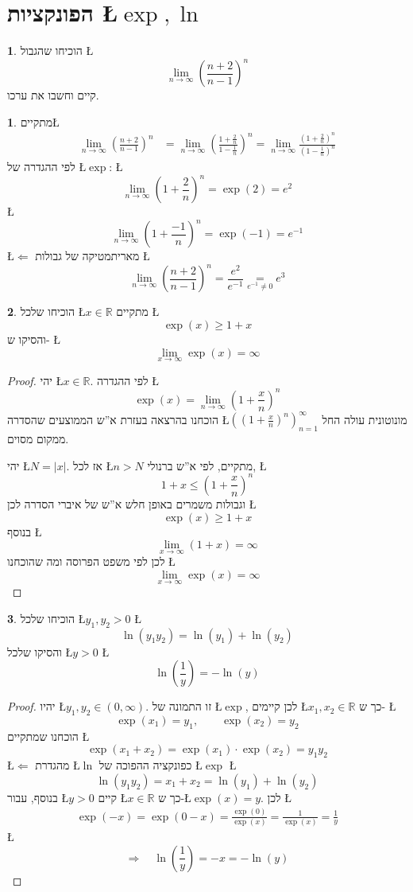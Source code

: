 \documentclass[english,hebrew]{article}
\theoremstyle{definition}
\newtheorem*{problem*}{\protect\problemname}
\theoremstyle{definition}
\newtheorem*{sol*}{\protect\solutionname}
\providecommand{\problemname}{בעיה}
\providecommand{\solutionname}{פתרון}
\begin{document}
\part{הפונקציות \L{$\exp,\ln$}}
\begin{problem*}
הוכיחו שהגבול \L{%
\[
\lim_{n\to\infty}\left(\frac{n+2}{n-1}\right)^{n}
\]
}%
קיים וחשבו את ערכו.
\end{problem*}
\begin{sol*}
מתקיים\L{%
\begin{align*}
\lim_{n\to\infty}\left(\frac{n+2}{n-1}\right)^{n} & =\lim_{n\to\infty}\left(\frac{1+\frac{2}{n}}{1-\frac{1}{n}}\right)^{n}=\lim_{n\to\infty}\frac{\left(1+\frac{2}{n}\right)^{n}}{\left(1-\frac{1}{n}\right)^{n}}
\end{align*}
}%
לפי ההגדרה של \L{$\exp$}: \L{%
\[
\lim_{n\to\infty}\left(1+\frac{2}{n}\right)^{n}=\exp(2)=e^{2}
\]
}%
\L{%
\[
\lim_{n\to\infty}\left(1+\frac{-1}{n}\right)^{n}=\exp(-1)=e^{-1}
\]
}%
\L{$\Leftarrow$} מאריתמטיקה של גבולות \L{%
\[
\lim_{n\to\infty}\left(\frac{n+2}{n-1}\right)^{n}=\frac{e^{2}}{e^{-1}}\underset{e^{-1}\ne0}{=}e^{3}
\]
}%
\end{sol*}
\begin{problem*}
הוכיחו שלכל \L{$x\in\mathbb{R}$} מתקיים \L{%
\[
\exp(x)\ge1+x
\]
}%
והסיקו ש- \L{%
\[
\lim_{x\to\infty}\exp(x)=\infty
\]
}%
\end{problem*}
\begin{proof}
יהי \L{$x\in\mathbb{R}$}. לפי ההגדרה \L{%
\[
\exp(x)=\lim_{n\to\infty}\left(1+\frac{x}{n}\right)^{n}
\]
}%
הוכחנו בהרצאה בעזרת א\textquotedblright ש הממוצעים שהסדרה \L{$\left(\left(1+\frac{x}{n}\right)^{n}\right)_{n=1}^{\infty}$}
מונוטונית עולה החל ממקום מסוים. 

יהי \L{$N=\left|x\right|$}. אז לכל \L{$n>N$} מתקיים, לפי א\textquotedblright ש
ברנולי, \L{%
\[
1+x\le\left(1+\frac{x}{n}\right)^{n}
\]
}%
וגבולות משמרים באופן חלש א\textquotedblright ש של איברי הסדרה לכן
\L{%
\[
\exp(x)\ge1+x
\]
}%
בנוסף \L{%
\[
\lim_{x\to\infty}(1+x)=\infty
\]
}%
לכן לפי משפט הפרוסה ומה שהוכחנו \L{%
\[
\lim_{x\to\infty}\exp(x)=\infty
\]
}%
\end{proof}
\begin{problem*}
הוכיחו שלכל \L{$y_{1},y_{2}>0$} \L{%
\[
\ln(y_{1}y_{2})=\ln(y_{1})+\ln(y_{2})
\]
}%
והסיקו שלכל \L{$y>0$} \L{%
\[
\ln\!\left(\frac{1}{y}\right)=-\ln(y)
\]
}%
\end{problem*}
\begin{proof}
יהיו \L{$y_{1},y_{2}\in(0,\infty)$}. זו התמונה של \L{$\exp$}, לכן
קיימים \L{$x_{1},x_{2}\in\mathbb{R}$} כך ש- \L{%
\[
\exp(x_{1})=y_{1},\qquad\exp(x_{2})=y_{2}
\]
}%
הוכחנו שמתקיים \L{%
\[
\exp(x_{1}+x_{2})=\exp(x_{1})\cdot\exp(x_{2})=y_{1}y_{2}
\]
}%
\L{$\Leftarrow$} מהגדרת \L{$\ln$} כפונקציה ההפוכה של \L{$\exp$}
\L{%
\[
\ln(y_{1}y_{2})=x_{1}+x_{2}=\ln(y_{1})+\ln(y_{2})
\]
}%
בנוסף, עבור \L{$y>0$} קיים \L{$x\in\mathbb{R}$} כך ש-\L{$\exp(x)=y$}.
לכן \L{%
\begin{align*}
\exp(-x)=\exp(0-x)=\frac{\exp(0)}{\exp(x)}=\frac{1}{\exp(x)}=\frac{1}{y}
\end{align*}
}%
\L{%
\[
\Rightarrow\quad\ln\!\left(\frac{1}{y}\right)=-x=-\ln(y)
\]
}%
\end{proof}
\end{document}
